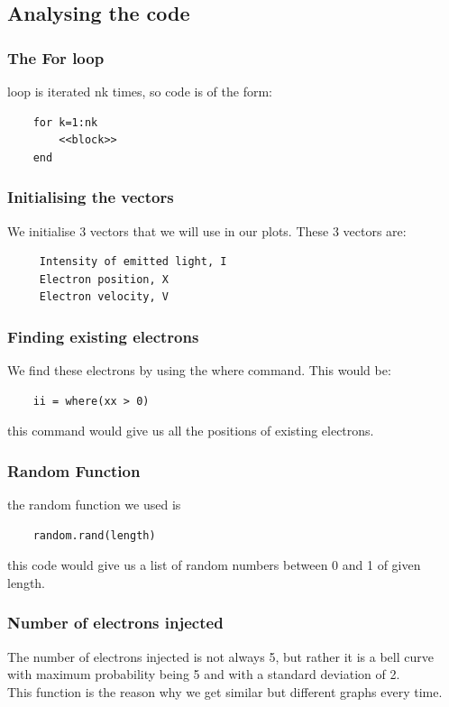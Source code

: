 \documentclass[11pt]{article}
\begin{document}
\subsection{Analysing the code}
\subsubsection{The For loop}
loop is iterated nk times, so code is of the form:
\begin{verbatim}
    for k=1:nk
        <<block>>
    end
\end{verbatim}

\subsubsection{Initialising the vectors}
We initialise 3 vectors that we will use in our plots. These 3 vectors are:
\begin{verbatim}
     Intensity of emitted light, I
     Electron position, X
     Electron velocity, V
\end{verbatim}

\subsubsection{Finding existing electrons}
We find these electrons by using the where command. This would be:
\begin{verbatim}
    ii = where(xx > 0)
\end{verbatim}
this command would give us all the positions of existing electrons.

\subsubsection{Random Function}
the random function we used is
\begin{verbatim}
    random.rand(length)
\end{verbatim}
this code would give us a list of random numbers between 0 and 1 of given length.

\subsubsection{Number of electrons injected}
The number of electrons injected is not always 5, but rather it is a bell curve with maximum probability being 5 and with a standard deviation of 2. \\

This function is the reason why we get similar but different graphs every time.
\end{document}
